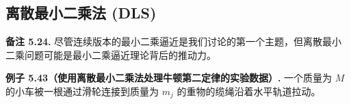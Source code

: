\documentclass[a4paper]{ctexart}
\newcommand{\hl}[1]
{\noindent {\bf {#1}}}
\begin{document}
{%










\subsection{离散最小二乘法 (DLS)}

\noindent \textbf{备注 5.24.} 尽管连续版本的最小二乘逼近是我们讨论的第一个主题，但离散最小二乘问题可能是最小二乘逼近理论背后的推动力。

\noindent \textbf{例子 5.43（使用离散最小二乘法处理牛顿第二定律的实验数据）.} 
一个质量为 $M$ 的小车被一根通过滑轮连接到质量为 $m_j$ 的重物的缆绳沿着水平轨道拉动。

}
\end{document}
